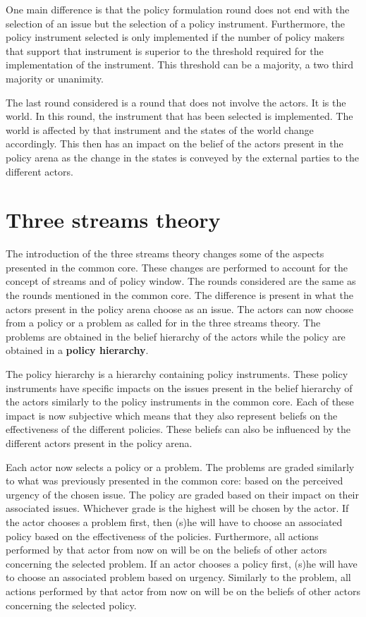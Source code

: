 \documentclass{article}
\begin{document}
One main difference is that the policy formulation round does not end with the selection of an issue but the selection of a policy instrument. Furthermore, the policy instrument selected is only implemented if the number of policy makers that support that instrument is superior to the threshold required for the implementation of the instrument. This threshold can be a majority, a two third majority or unanimity.

The last round considered is a round that does not involve the actors. It is the world. In this round, the instrument that has been selected is implemented. The world is affected by that instrument and the states of the world change accordingly. This then has an impact on the belief of the actors present in the policy arena as the change in the states is conveyed by the external parties to the different actors.

\section{Three streams theory}

The introduction of the three streams theory changes some of the aspects presented in the common core. These changes are performed to account for the concept of streams and of policy window. The rounds considered are the same as the rounds mentioned in the common core. The difference is present in what the actors present in the policy arena choose as an issue. The actors can now choose from a policy or a problem as called for in the three streams theory. The problems are obtained in the belief hierarchy of the actors while the policy are obtained in a {\bfseries policy hierarchy}. 

The policy hierarchy is a hierarchy containing policy instruments. These policy instruments have specific impacts on the issues present in the belief hierarchy of the actors similarly to the policy instruments in the common core. Each of these impact is now subjective which means that they also represent beliefs on the effectiveness of the different policies. These beliefs can also be influenced by the different actors present in the policy arena.

Each actor now selects a policy or a problem. The problems are graded similarly to what was previously presented in the common core: based on the perceived urgency of the chosen issue. The policy are graded based on their impact on their associated issues. Whichever grade is the highest will be chosen by the actor. If the actor chooses a problem first, then (s)he will have to choose an associated policy based on the effectiveness of the policies. Furthermore, all actions performed by that actor from now on will be on the beliefs of other actors concerning the selected problem. If an actor chooses a policy first, (s)he will have to choose an associated problem based on urgency. Similarly to the problem, all actions performed by that actor from now on will be on the beliefs of other actors concerning the selected policy.
\end{document}
